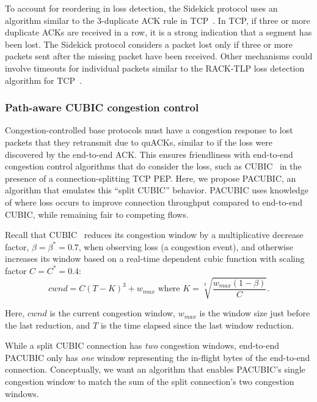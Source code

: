 To account for reordering in loss detection, the Sidekick protocol uses an
algorithm similar to the 3-duplicate ACK rule in
TCP~\cite{rfc5681tcp,rfc2001tcp}. In TCP, if three or more duplicate ACKs are
received in a row, it is a strong indication that a segment has been lost. The
Sidekick protocol considers a packet lost only if three or more packets sent
after the missing packet have been received. Other mechanisms could involve
timeouts for individual packets similar to the RACK-TLP loss detection
algorithm for TCP~\cite{rfc8985}.


\subsubsection{Path-aware CUBIC congestion control}
\label{sec:sidekick:sender:pacubic}

Congestion-controlled base protocols must have a congestion response to lost
packets that they retransmit due to quACKs, similar to if the loss were
discovered by the end-to-end ACK.
This ensures friendliness with end-to-end congestion control algorithms that do
consider the loss, such as CUBIC~\cite{ha2008cubic} in the presence of a
connection-splitting TCP PEP.
Here, we propose PACUBIC, an algorithm that emulates this ``split CUBIC''
behavior. PACUBIC uses knowledge of where loss occurs to improve connection
throughput compared to end-to-end CUBIC, while remaining fair to competing flows.

Recall that CUBIC~\cite{ha2008cubic} reduces its congestion window by a
multiplicative decrease factor,
$\beta = \beta^* = 0.7$, when observing loss (a congestion event), and otherwise increases
its window based on a real-time dependent cubic function with scaling factor
$C=C^*=0.4$:
\[
cwnd = C(T-K)^3 + w_{max} \text{ where } K = \sqrt[3]{\frac{w_{max}(1-\beta)}{C}}.
\]

\noindent Here, $cwnd$ is the current congestion window,
$w_{max}$ is the window size just before the last reduction,
and $T$ is the time elapsed since the last window reduction.

While a split CUBIC connection has \emph{two} congestion windows,
end-to-end PACUBIC only has \emph{one} window representing the in-flight bytes
of the end-to-end connection.
Conceptually, we want an algorithm that enables PACUBIC's single
congestion window to match the sum of the split connection's two congestion
windows.

